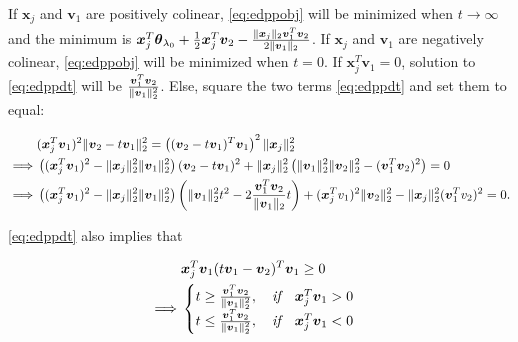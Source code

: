 If $\boldsymbol x_j$ and $\boldsymbol v_1$ are positively colinear, \eqref{eq:edppobj} will be minimized when $t\xrightarrow[]{}\infty$ and the minimum is $\boldsymbol x_j^T\boldsymbol\theta_{\lambda_0}+\frac{1}{2}\boldsymbol x_j^T \boldsymbol v_2-\frac{\lVert\boldsymbol x_j\rVert_2 \boldsymbol v_1^T \boldsymbol v_2}{2\lVert\boldsymbol v_1\rVert_2 }$. If $\boldsymbol x_j$ and $\boldsymbol v_1$ are negatively colinear, \eqref{eq:edppobj} will be minimized when $t=0$. If $\boldsymbol x_j^T \boldsymbol v_1=0$, solution to \eqref{eq:edppdt} will be $\frac{\boldsymbol v_1^T \boldsymbol v_2}{\lVert\boldsymbol v_1\rVert_2^2}$. Else, square the two terms \eqref{eq:edppdt} and set them to equal:

\begin{gather}
    \begin{aligned}
        \label{eq:edppquad}
        &(\boldsymbol x_j^T \boldsymbol v_1)^2\lVert\boldsymbol v_2-t\boldsymbol v_1\rVert_2^2=\left((\boldsymbol v_2-t\boldsymbol v_1)^T \boldsymbol v_1\right)^2\lVert\boldsymbol x_j\rVert_2^2\\
        \implies&\left((\boldsymbol x_j^T\boldsymbol v_1)^2-\lVert\boldsymbol x_j\rVert_2^2\lVert\boldsymbol v_1\rVert_2^2\right)(\boldsymbol v_2-t\boldsymbol v_1)^2+\lVert\boldsymbol x_j\rVert_2^2\left(\lVert\boldsymbol v_1\rVert_2^2\lVert\boldsymbol v_2\rVert_2^2-(\boldsymbol v_1^T\boldsymbol v_2)^2\right)=0\\
        \implies&\left((\boldsymbol x_j^T\boldsymbol v_1)^2-\lVert\boldsymbol x_j\rVert_2^2\lVert\boldsymbol v_1\rVert_2^2\right)\left(\lVert\boldsymbol v_1\rVert_2^2t^2-2\frac{\boldsymbol v_1^T \boldsymbol v_2}{\lVert\boldsymbol v_1\rVert_2}t\right)+(\boldsymbol x_j^T v_1)^2\lVert\boldsymbol v_2\rVert_2^2-\lVert\boldsymbol x_j\rVert_2^2(\boldsymbol v_1^Tv_2)^2=0.
    \end{aligned}
\end{gather}

\eqref{eq:edppdt} also implies that

\begin{gather}
    \begin{aligned}
        &\boldsymbol x_j^T\boldsymbol v_1(t\boldsymbol v_1-\boldsymbol v_2)^T\boldsymbol v_1\geq 0\\
        \implies&\begin{cases}
        t\geq\frac{\boldsymbol v_1^T\boldsymbol v_2}{\lVert\boldsymbol v_1\rVert_2^2},\quad \textit{if}\quad\boldsymbol x_j^T\boldsymbol v_1>0\\
        t\leq\frac{\boldsymbol v_1^T\boldsymbol v_2}{\lVert\boldsymbol v_1\rVert_2^2},\quad \textit{if}\quad\boldsymbol x_j^T\boldsymbol v_1<0
        \end{cases}
    \end{aligned}
\end{gather}

